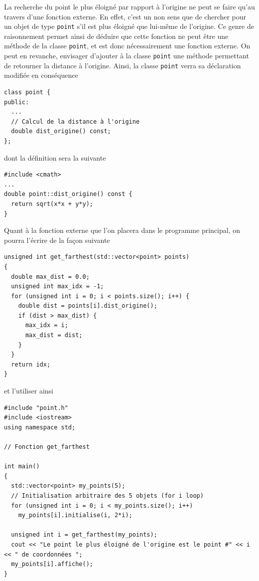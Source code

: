\documentclass{book}
\begin{document}
\begin{correction}
La recherche du point le plus éloigné par rapport à l'origine ne peut se faire
qu'au travers d'une fonction externe. En effet, c'est un non sens que de
chercher pour un objet de type \texttt{point} s'il est plus éloigné que lui-même de
l'origine. Ce genre de raisonnement permet ainsi de déduire que cette fonction
ne peut être une méthode de la classe \texttt{point}, et est donc
nécessairement une fonction externe. On peut en revanche, envisager d'ajouter à
la classe \texttt{point} une méthode permettant de retourner la distance à l'origine.
Ainsi, la classe \texttt{point} verra sa déclaration modifiée en conséquence
\begin{verbatim}
class point {
public:
  ...
  // Calcul de la distance à l'origine
  double dist_origine() const;
};
\end{verbatim}
dont la définition sera la suivante
\begin{verbatim}
#include <cmath>
...
double point::dist_origine() const {
  return sqrt(x*x + y*y);
}
\end{verbatim}

Quant à la fonction externe que l'on placera dans le programme principal, on
pourra l'écrire de la façon suivante
\begin{verbatim}
unsigned int get_farthest(std::vector<point> points)
{
  double max_dist = 0.0;
  unsigned int max_idx = -1;
  for (unsigned int i = 0; i < points.size(); i++) {
    double dist = points[i].dist_origine();
    if (dist > max_dist) {
      max_idx = i;
      max_dist = dist;
    }
  }
  return idx;
}
\end{verbatim}
et l'utiliser ainsi
\begin{verbatim}
#include "point.h"
#include <iostream>
using namespace std;

// Fonction get_farthest

int main()
{
  std::vector<point> my_points(5);
  // Initialisation arbitraire des 5 objets (for i loop)
  for (unsigned int i = 0; i < my_points.size(); i++)
    my_points[i].initialise(i, 2*i);

  unsigned int i = get_farthest(my_points);
  cout << "Le point le plus éloigné de l'origine est le point #" << i << " de coordonnées ";
  my_points[i].affiche();
}
\end{verbatim}

\end{correction}
\end{document}
